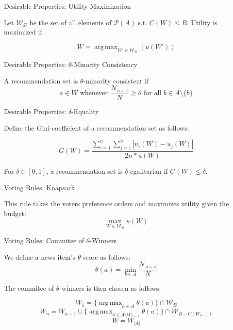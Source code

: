 \documentclass{beamer}
\DeclareMathOperator*{\argmax}{arg\,max}
\begin{document}
\begin{frame}{Desirable Properties: Utility Maximization}

Let $\mathcal {W_B}$ be the set of all elements of $\mathcal{P}(A)$ s.t. $C(W)\leq B$. Utility is maximized if:

\[
W=\argmax_{W'\in \mathcal{W}_B}(u(W')) 
\]

	
\end{frame}

\begin{frame}{Desirable Properties: $\theta$-Minority Consistency}
	
A recommendation set is $\theta$-minority consistent if \[a\in W\text{ whenever }\frac {\mathcal{N}_{a\succ b}}{N}\geq \theta \text{ for all } b\in A\setminus \{b\} \]
	
\end{frame}

\begin{frame}{Desirable Properties: $\delta$-Equality}
	
	Define the Gini-coefficient of a recommendation set as follows: 
	
	\[G(W)=\frac{\displaystyle{\sum_{i=1}^n \sum_{j=1}^n \left| u_i(W) - u_j(W) \right|}}{\displaystyle{2n* u(W)}}\]
	
	For $\delta\in [0,1]$, a recommendation set is $\delta$-egalitarian if $G(W)\leq \delta$. 
	
\end{frame}

\begin{frame}{Voting Rules: Knapsack}

This rule takes the voters preference orders and maximizes utility given the budget:
\[
\max_{W\in\mathcal{ W_B}} u(W)
	\]
	
\end{frame}

\begin{frame}{Voting Rules: Commitee of $\theta$-Winners}
	
We define a news item's $\theta$-score as follows: \[\theta(a)=\min_{b\in A} \frac{\mathcal{N}_{a\succ b}}{N}\]

The commitee of $\theta$-winners is then chosen as follows:

\[W_1=\{\argmax_{a\in A}\theta(a)\}\cap \mathcal{W}_B\]
\[W_n=W_{n-1}\cup \{\argmax_{a\in A\setminus W_{n-1}}\theta (a)\}\cap \mathcal{W}_{B-C(W_{n-1})}\]
\[W=W_{|A|}\]

\end{frame}
\end{document}
